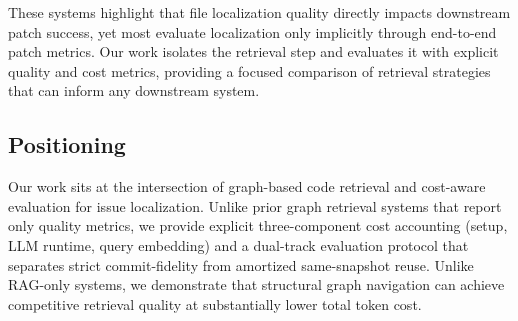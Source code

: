 These systems highlight that file localization quality directly impacts downstream patch success, yet most evaluate localization only implicitly through end-to-end patch metrics. Our work isolates the retrieval step and evaluates it with explicit quality and cost metrics, providing a focused comparison of retrieval strategies that can inform any downstream system.

\subsection{Positioning}
\label{sec:rw_positioning}

Our work sits at the intersection of graph-based code retrieval and cost-aware evaluation for issue localization. Unlike prior graph retrieval systems that report only quality metrics, we provide explicit three-component cost accounting (setup, LLM runtime, query embedding) and a dual-track evaluation protocol that separates strict commit-fidelity from amortized same-snapshot reuse. Unlike RAG-only systems, we demonstrate that structural graph navigation can achieve competitive retrieval quality at substantially lower total token cost.
